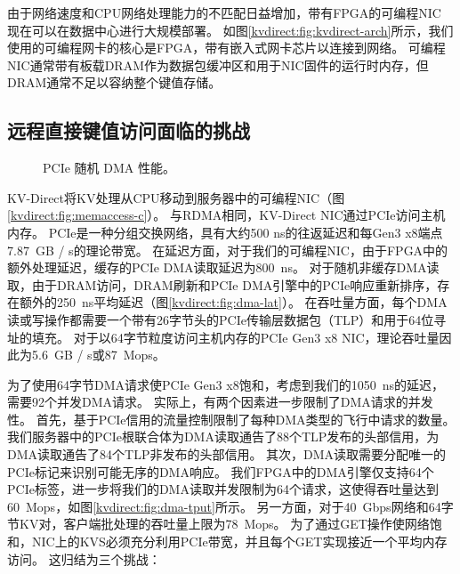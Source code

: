 由于网络速度和CPU网络处理能力的不匹配日益增加，带有FPGA的可编程NIC \cite {vfp,greenberg2015sdn,li2016clicknp,caulfield2016cloud} 现在可以在数据中心进行大规模部署。
如图\ref {kvdirect:fig:kvdirect-arch}所示，我们使用的可编程网卡的核心是FPGA，带有嵌入式网卡芯片以连接到网络。
可编程NIC通常带有板载DRAM作为数据包缓冲区和用于NIC固件的运行时内存\cite {li2016clicknp}，但DRAM通常不足以容纳整个键值存储。

\subsection{远程直接键值访问面临的挑战}
\label{kvdirect:sec:challenge}

\begin{figure}[t]
\centering
{}
\caption{PCIe 随机 DMA 性能。}
\label{kvdirect:fig:dma-perf}

\end{figure}

KV-Direct将KV处理从CPU移动到服务器中的可编程NIC（图\ref {kvdirect:fig:memaccess-c}）。
与RDMA相同，KV-Direct NIC通过PCIe访问主机内存。 PCIe是一种分组交换网络，具有大约500 ns的往返延迟和每Gen3 x8端点7.87~GB / s的理论带宽。
在延迟方面，对于我们的可编程NIC，由于FPGA中的额外处理延迟，缓存的PCIe DMA读取延迟为800~ns。
对于随机非缓存DMA读取，由于DRAM访问，DRAM刷新和PCIe DMA引擎中的PCIe响应重新排序，存在额外的250~ns平均延迟（图\ref {kvdirect:fig:dma-lat}）。
在吞吐量方面，每个DMA读或写操作都需要一个带有26字节头的PCIe传输层数据包（TLP）和用于64位寻址的填充。
对于以64字节粒度访问主机内存的PCIe Gen3 x8 NIC，理论吞吐量因此为5.6~GB / s或87~Mops。

为了使用64字节DMA请求使PCIe Gen3 x8饱和，考虑到我们的1050~ns的延迟，需要92个并发DMA请求。
实际上，有两个因素进一步限制了DMA请求的并发性。
首先，基于PCIe信用的流量控制限制了每种DMA类型的飞行中请求的数量。我们服务器中的PCIe根联合体为DMA读取通告了88个TLP发布的头部信用，为DMA读取通告了84个TLP非发布的头部信用。
其次，DMA读取需要分配唯一的PCIe标记来识别可能无序的DMA响应。
我们FPGA中的DMA引擎仅支持64个PCIe标签，进一步将我们的DMA读取并发限制为64个请求，这使得吞吐量达到60~Mops，如图\ref {kvdirect:fig:dma-tput}所示。
另一方面，对于40~Gbps网络和64字节KV对，客户端批处理的吞吐量上限为78~Mops。
为了通过GET操作使网络饱和，NIC上的KVS必须充分利用PCIe带宽，并且每个GET实现接近一个平均内存访问。
这归结为三个挑战：

